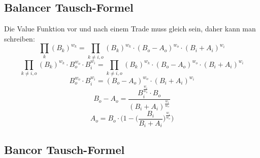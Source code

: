 \documentclass[12pt,a4paper,titlepage,oneside,english]{article}
\begin{document}
\subsection{Balancer Tausch-Formel}
\label{sec:Balancer Tausch-Formel}

Die Value Funktion vor und nach einem Trade muss gleich sein, daher kann man schreiben:\\
\begin{equation*}
\prod_{k}(B_{k})^{w_{k}} = \prod_{k \neq i,o}(B_{k})^{w_{k}}\cdot (B_{o}-A_{o})^{w_{o}}\cdot(B_{i}+A_{i})^{w_{i}}
\end{equation*}
\begin{equation*}
\prod_{k \neq i,o}(B_{k})^{w_{k}}\cdot B_{o}^{w_{o}} \cdot B_{i}^{w_{i}} = \prod_{k \neq i,o}(B_{k})^{w_{k}}\cdot (B_{o}-A_{o})^{w_{o}}\cdot(B_{i}+A_{i})^{w_{i}}
\end{equation*}
\begin{equation*}
B_{o}^{w_{o}} \cdot B_{i}^{w_{i}} = (B_{o}-A_{o})^{w_{o}}\cdot(B_{i}+A_{i})^{w_{i}}
\end{equation*}
\begin{equation*}
B_{o}- A_{o} = \dfrac{B_{i}^{\tfrac{w_{i}}{w_{o}}}\cdot B_{o}}{(B_{i}+A_{i})^{\tfrac{w_{i}}{w_{o}}}}
\end{equation*}
\begin{equation*}
A_{o}= B_{o}\cdot \Biggl( 1 - \biggl(\dfrac{B_{i}}{B_{i}+A_{i}}\biggr)^{\tfrac{w_{i}}{w_{o}}}\Biggr)
\end{equation*}

\subsection{Bancor Tausch-Formel}
\label{sec:Bancor Tausch-Formel}
\end{document}
